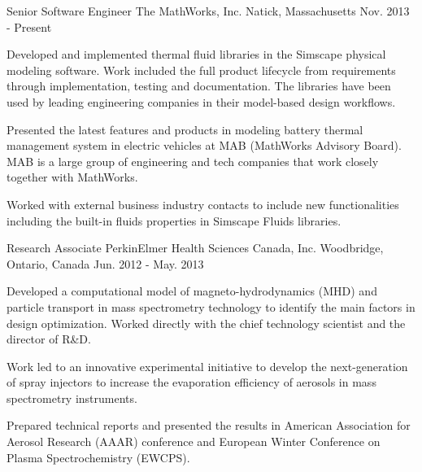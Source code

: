 


\begin{cventries}


\cventry
{Senior Software Engineer} %
{The MathWorks, Inc.} %
{Natick, Massachusetts} %
{Nov. 2013 - Present} %
{ %
\begin{cvitems}
\item {Developed and implemented thermal fluid libraries in the Simscape physical modeling software. Work included the full product lifecycle from requirements through implementation, testing and documentation. The libraries have been used by leading engineering companies in their model-based design workflows. }
\item {Presented the latest features and products in modeling battery thermal management system in electric vehicles at MAB (MathWorks Advisory Board). MAB is a large group of engineering and tech companies that work closely together with MathWorks.}
\item{Worked with external business industry contacts to include new functionalities including the built-in fluids properties in Simscape Fluids libraries.\\}
\end{cvitems}
}


\cventry
{Research Associate} %
{PerkinElmer Health Sciences Canada, Inc.} %
{Woodbridge, Ontario, Canada} %
{Jun. 2012 - May. 2013} %
{ %
\begin{cvitems}
\item {Developed a computational model of magneto-hydrodynamics (MHD) and particle transport in mass spectrometry technology to identify the main factors in design optimization. Worked directly with the chief technology scientist and the director of R\&D.}
\item {Work led to an innovative experimental initiative to develop the next-generation of spray injectors
to increase the evaporation efficiency of aerosols in mass spectrometry instruments.}
\item{Prepared technical reports and presented the results in American Association for Aerosol Research (AAAR) conference and European Winter Conference on Plasma Spectrochemistry (EWCPS).\\}
\end{cvitems}
}


\end{cventries}
